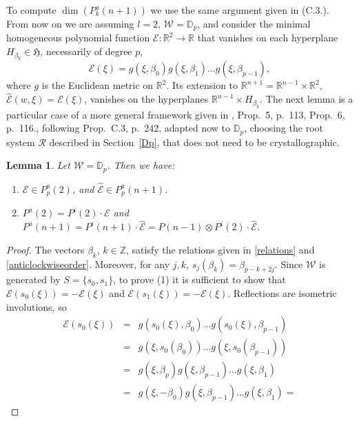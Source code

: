 \documentclass[11pt,a4paper,times]{amsart}
\theoremstyle{plain}
\newtheorem{lemma}[thm]{Lemma}
\theoremstyle{definition}
\numberwithin{equation}{section}
\newcommand{\R}{\mathbb{R}}
\newcommand{\D}{\mathbb{D}}
\newcommand{\txtg}{\textcolor{green}}
\begin{document}
{ To compute $\dim(P^a_k(n+1))$ we use the same argument given in  \cite{bb}(C.3.).
From now on we are assuming $l=2$, $\mathcal{W}=\mathbb{D}_p$, and consider the minimal homogeneous  polynomial  function 
$\mathcal{E}:\mathbb{R}^2\to \mathbb{R}$  that vanishes on each hyperplane $H_{\beta_k}\in \mathfrak{H}$, necessarily of degree $p$, 
\begin{equation}\label{Epoly}
\mathcal{E}(\xi)=g(\xi,\beta_0)g(\xi, \beta_1)\ldots g(\xi,\beta_{p-1}), 
\end{equation}
where $g$ is the Euclidean metric on $\R^2$. Its  extension  to $\mathbb{R}^{n+1}=\mathbb{R}^{n-1}\times\mathbb{R}^2$,  $\hat{\mathcal{E}}(w,\xi)=\mathcal{E}(\xi)$, vanishes on the
hyperplanes  $\mathbb{R}^{n-1}\times H_{\beta_k}$. The next lemma is a particular case  of
a more general framework given in  \cite{BOU}, Prop.\ 5, p.\ 113, Prop.\ 6, p.\ 116.,  following \cite{bb} Prop.\ C.3, p.\ 242, adapted now to $\mathbb{D}_p$,  choosing the root system $\mathcal{R}$  described in Section~\ref{Dp}, that does not need to be crystallographic.
%
\begin{lemma}\label{BOU BB}
 Let $\mathcal{W}=\D_p$. Then we have: 
 \begin{enumerate}[{\rm 1)}]
\item $\mathcal{E}\in P_p^a(2)$, and  $\hat{\mathcal{E}}\in P_p^a(n+1)$.\\
\item $P^a(2)=P^i(2)\cdot\mathcal{E}$
and $P^a(n+1)=P^i(n+1)\cdot\hat{\mathcal{E}}=P(n-1)\otimes P^i(2)\cdot \hat{\mathcal{E}}$.
\end{enumerate}
\end{lemma}
%
\begin{proof} 
 The vectors $\beta_k$, $k\in \mathbb{Z}$,  satisfy the relations given in \eqref{relations} and \eqref{anticlockwiseorder}.
Moreover,  for any $j,k$,   
$s_j(\beta_k)=\beta_{p-k+2j}$. 
Since $\mathcal{W}$ is generated by $S=\{s_0,s_1\}$, to prove (1) it is sufficient to show  that
$\mathcal{E}(s_0(\xi))=- \mathcal{E}(\xi)$ and  
$\mathcal{E}(s_1(\xi))=- \mathcal{E}(\xi)$.
Reflections are isometric involutions, so
\begin{eqnarray*}
\mathcal{E}(s_0(\xi))&=& g(s_0(\xi),\beta_0)\ldots g(s_0(\xi),\beta_{p-1})\\
&=&g(\xi,s_0(\beta_0))\ldots g(\xi,s_0(\beta_{p-1}))\\
&=&g(\xi,\beta_p)g(\xi,\beta_{p-1})\ldots g(\xi,\beta_1)\\
&=&g(\xi, -\beta_0)g(\xi,\beta_{p-1})\ldots g(\xi,\beta_1)=

\end{eqnarray*}
\end{proof}}
\end{document}
